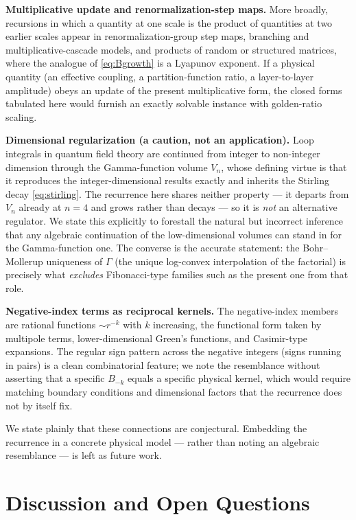 \documentclass[11pt,a4paper]{article}
\theoremstyle{definition}
\begin{document}
\textbf{Multiplicative update and renormalization-step maps.} More broadly, recursions in which a quantity at one scale is the product of quantities at two earlier scales appear in renormalization-group step maps, branching and multiplicative-cascade models, and products of random or structured matrices, where the analogue of \eqref{eq:Bgrowth} is a Lyapunov exponent. If a physical quantity (an effective coupling, a partition-function ratio, a layer-to-layer amplitude) obeys an update of the present multiplicative form, the closed forms tabulated here would furnish an exactly solvable instance with golden-ratio scaling.

\textbf{Dimensional regularization (a caution, not an application).} Loop integrals in quantum field theory are continued from integer to non-integer dimension through the Gamma-function volume \(V_n\), whose defining virtue is that it reproduces the integer-dimensional results exactly and inherits the Stirling decay \eqref{eq:stirling}. The recurrence here shares neither property --- it departs from \(V_n\) already at \(n=4\) and grows rather than decays --- so it is \emph{not} an alternative regulator. We state this explicitly to forestall the natural but incorrect inference that any algebraic continuation of the low-dimensional volumes can stand in for the Gamma-function one. The converse is the accurate statement: the Bohr--Mollerup uniqueness of \(\Gamma\) (the unique log-convex interpolation of the factorial) is precisely what \emph{excludes} Fibonacci-type families such as the present one from that role.

\textbf{Negative-index terms as reciprocal kernels.} The negative-index members are rational functions \(\sim r^{-k}\) with \(k\) increasing, the functional form taken by multipole terms, lower-dimensional Green's functions, and Casimir-type expansions. The regular sign pattern across the negative integers (signs running in pairs) is a clean combinatorial feature; we note the resemblance without asserting that a specific \(B_{-k}\) equals a specific physical kernel, which would require matching boundary conditions and dimensional factors that the recurrence does not by itself fix.

We state plainly that these connections are conjectural. Embedding the recurrence in a concrete physical model — rather than noting an algebraic resemblance — is left as future work.

\section{Discussion and Open Questions}
\end{document}
